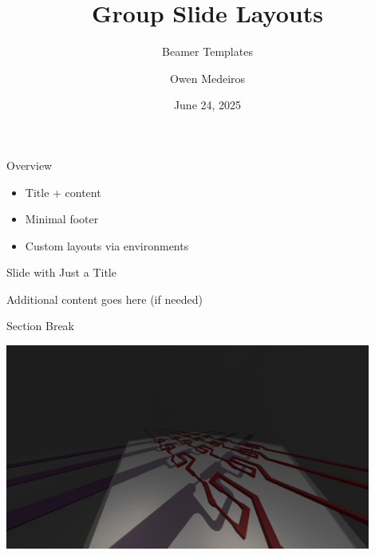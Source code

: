 \documentclass[aspectratio=169]{beamer}
\title{Group Slide Layouts}
\subtitle{Beamer Templates}
\author{Owen Medeiros}
\affil{Quantum Nanostructures and Nanofabrication Group, MIT}
\date{June 24, 2025}
\begin{document}
\begin{SlideTitleSlide}
\end{SlideTitleSlide}


\begin{SlideTitleContent}{Overview}
    \begin{itemize}
        \item Title + content
        \item Minimal footer
        \item Custom layouts via environments
    \end{itemize}
\end{SlideTitleContent}

\begin{SlideTitleOnly}{Slide with Just a Title}
    \begin{center}
        \Large Additional content goes here (if needed)
    \end{center}
\end{SlideTitleOnly}

\begin{SlideTitleCentered}{Section Break}
\end{SlideTitleCentered}

\begin{SlideImageOnly}
    \includegraphics[width=0.9\textwidth]{example_image.png}  %
\end{SlideImageOnly}
\end{document}
